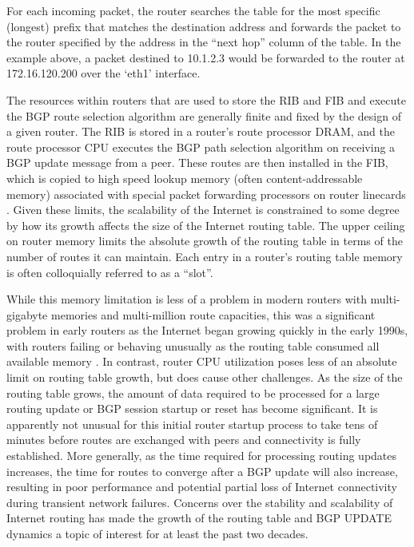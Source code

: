 For each incoming packet, the router searches the table for the most specific
(longest) prefix that matches the destination address and forwards the packet
to the router specified by the address in the ``next hop'' column of the table.
In the example above, a packet destined to 10.1.2.3 would be forwarded to the
router at 172.16.120.200 over the `eth1' interface.

The resources within routers that are used to store the RIB and FIB and execute
the BGP route selection algorithm are generally finite and fixed by the design
of a given router. The RIB is stored in a router's route processor DRAM, and
the route processor CPU executes the BGP path selection algorithm on receiving
a BGP update message from a peer. These routes are then installed in the FIB,
which is copied to high speed lookup memory (often content-addressable memory)
associated with special packet forwarding processors on router linecards
\cite{Zhao:2010fu}. Given these limits, the scalability of the Internet is
constrained to some degree by how its growth affects the size of the Internet
routing table. The upper ceiling on router memory limits the absolute growth of
the routing table in terms of the number of routes it can maintain. Each entry
in a router's routing table memory is often colloquially referred to as a
``slot''.

While this memory limitation is less of a problem in modern routers with
multi-gigabyte memories and multi-million route capacities, this was a
significant problem in early routers as the Internet began growing quickly in
the early 1990s, with routers failing or behaving unusually as the routing
table consumed all available memory \cite{Li:2011vn}. In contrast, router CPU
utilization poses less of an absolute limit on routing table growth, but does
cause other challenges. As the size of the routing table grows, the amount of
data required to be processed for a large routing update or BGP session startup
or reset has become significant. It is apparently not unusual for this initial
router startup process to take tens of minutes \cite{Steenbergen:2010nx} before
routes are exchanged with peers and connectivity is fully established. More
generally, as the time required for processing routing updates increases, the
time for routes to converge after a BGP update will also increase, resulting in
poor performance and potential partial loss of Internet connectivity during
transient network failures. Concerns over the stability and scalability of
Internet routing has made the growth of the routing table and BGP UPDATE
dynamics a topic of interest for at least the past two decades.


